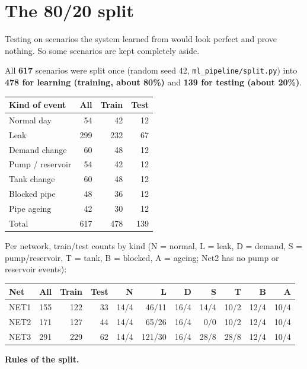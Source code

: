 \documentclass[11pt,a4paper]{article}
\newcommand{\code}[1]{\texttt{#1}}
\begin{document}
\section{The 80/20 split}
\begin{key}Testing on scenarios the system learned from would look perfect and prove nothing. So some scenarios are kept completely aside.\end{key}
All \textbf{617} scenarios were split once (random seed 42, \code{ml\_pipeline/split.py}) into \textbf{478 for learning (training, about 80\%)} and \textbf{139 for testing (about 20\%)}.
\begin{center}\small\begin{tabular}{@{}lrrr@{}}\toprule
Kind of event & All & Train & Test \\\midrule
Normal day & 54 & 42 & 12 \\
Leak & 299 & 232 & 67 \\
Demand change & 60 & 48 & 12 \\
Pump / reservoir & 54 & 42 & 12 \\
Tank change & 60 & 48 & 12 \\
Blocked pipe & 48 & 36 & 12 \\
Pipe ageing & 42 & 30 & 12 \\
\midrule
Total & 617 & 478 & 139 \\
\bottomrule\end{tabular}\end{center}
Per network, train/test counts by kind (N = normal, L = leak, D = demand, S = pump/reservoir, T = tank, B = blocked, A = ageing; Net2 has no pump or reservoir events):
\begin{center}\small\begin{tabular}{@{}lrrrrrrrrrr@{}}\toprule
Net & All & Train & Test & N & L & D & S & T & B & A \\\midrule
NET1 & 155 & 122 & 33 & 14/4 & 46/11 & 16/4 & 14/4 & 10/2 & 12/4 & 10/4 \\
NET2 & 171 & 127 & 44 & 14/4 & 65/26 & 16/4 & 0/0 & 10/2 & 12/4 & 10/4 \\
NET3 & 291 & 229 & 62 & 14/4 & 121/30 & 16/4 & 28/8 & 28/8 & 12/4 & 10/4 \\
\bottomrule\end{tabular}\end{center}
\textbf{Rules of the split.}
\end{document}
